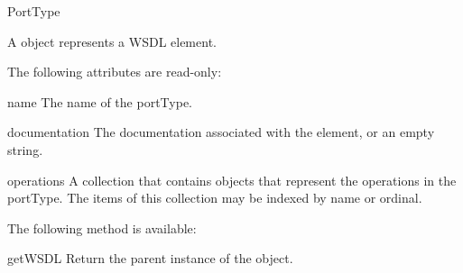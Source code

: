 \begin{classdesc}{PortType}{}

A  object represents a WSDL  element.

The following attributes are read-only:

\begin{memberdesc}{name}
The name of the portType.
\end{memberdesc}

\begin{memberdesc}{documentation}
The documentation associated with the element, or an empty string.
\end{memberdesc}

\begin{memberdesc}{operations}
A collection that contains  objects that represent the 
operations in the portType. The items of this collection may be indexed 
by name or ordinal. 
\end{memberdesc}

The following method is available:

\begin{methoddesc}{getWSDL}{}
Return the parent  instance of the object.
\end{methoddesc}

\end{classdesc}

